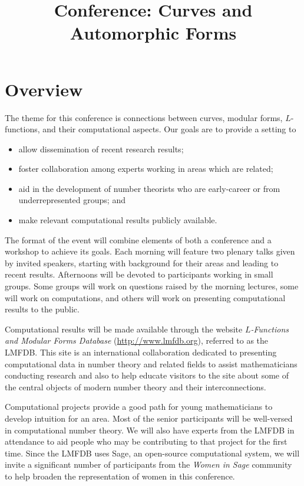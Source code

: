 \documentclass[12pt]{amsart}
\title{Conference: Curves and Automorphic Forms}
\numberwithin{equation}{section}
\begin{document}
%


\section{Overview}

The theme for this conference is connections
between curves, modular forms, $L$-functions, and their computational
aspects.
Our goals are to provide a setting to
\begin{itemize}
\item allow dissemination of recent research results;
\item foster collaboration among experts working in areas which are
  related;
\item aid in the development of number theorists who are early-career
  or from underrepresented groups; and 
\item make relevant computational results publicly available.
\end{itemize}

The format of the event will combine elements of both a conference and
a workshop to achieve its goals.  Each morning will feature two plenary
talks given by invited speakers, starting with background for their
areas and leading to recent results.  Afternoons will be devoted to
participants working in small groups.  Some groups will work on
questions raised by the morning lectures, some will work on
computations, and others will work on presenting computational
results to the public.

Computational results will be made available through the website {\em
  $L$-Functions and Modular Forms Database}
(\url{http://www.lmfdb.org}), referred to as the \textsf{LMFDB}.
This site is an international collaboration dedicated to presenting
computational data in number theory and related fields to assist
mathematicians conducting research and also to help educate
visitors to the site about some of the central objects of modern
number theory and their interconnections.

Computational projects provide a good path for young mathematicians to
develop intuition for an area.  Most of the senior participants will
be well-versed in computational number theory.  We will also have
experts from the \textsf{LMFDB} in attendance to aid people
who may be contributing to that project for the first time.  Since the
\textsf{LMFDB} uses \textsf{Sage}, an open-source computational
system, we will invite a significant number of participants from the
{\em Women in Sage} community to help broaden the representation of
women in this conference.
\end{document}
